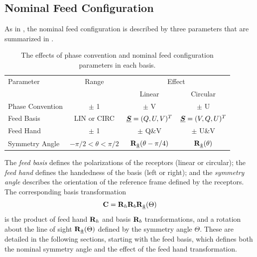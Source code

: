
\subsection{Nominal Feed Configuration}
\label{sec:nominal_feed}

As in \cite{vmjr10}, the nominal feed configuration is described by three parameters that are summarized in .
%
\begin{table}
\begin{center}
\caption{The effects of phase convention and nominal feed configuration parameters in each basis.}
\label{tab:parameters}
\begin{tabular}{lcc|c}
\hline

Parameter           & Range        & \multicolumn{2}{c}{Effect} \\
                    &              & Linear & Circular          \\

\hline

Phase Convention    & $\pm$ 1      & $\pm$ V     & $\pm$ U   \\

Feed Basis          & LIN or CIRC  & $\Pv{S}=(Q,U,V)^T$ & $\Pv{S}=(V,Q,U)^T$   \\

Feed Hand           & $\pm$ 1      & $\pm$ Q\&V     & $\pm$ U\&V \\

Symmetry Angle      & $-\pi/2<\theta<\pi/2$
& $\vRotation[z](\theta-\pi/4)$ & $\vRotation[z](\theta)$ \\
\hline
\end{tabular}
\end{center}
\end{table}
%
The \emph{feed basis} defines the polarizations of the 
receptors (linear or circular);
%
the \emph{feed hand} defines the handedness of the basis (left or right); and
%
the \emph{symmetry angle} describes the orientation of the reference frame defined by the receptors.
%
The corresponding basis transformation
%
\begin{equation}
    \JM{C} = \JM{R}_h \JM{R}_b \vRotation[z](\Theta)
\end{equation}
is the product of feed hand $\JM{R}_h$ and basis $\JM{R}_b$ transformations, and a rotation about the line of sight $\vRotation[z](\Theta)$ defined by the symmetry angle $\Theta$.  These are detailed in the following sections, starting with the feed basis, which defines both the nominal symmetry angle and the effect of the feed hand transformation.


